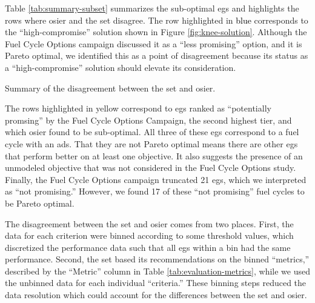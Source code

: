 Table \ref{tab:summary-subset} summarizes the sub-optimal \glspl{eg} and
highlights the rows where \gls{osier} and the \gls{set} disagree. The row
highlighted in \textcolor{black}{blue} corresponds to the ``high-compromise''
solution shown in Figure \ref{fig:knee-solution}. Although the Fuel Cycle
Options campaign discussed it as a ``less promising'' option, and it is Pareto
optimal, we identified this as a point of disagreement because its status as a
``high-compromise'' solution should elevate its consideration.

\begin{table}[ht!]
    \centering
    \caption{Summary of the disagreement between the \gls{set} and \gls{osier}.}
    \label{tab:summary-subset}
    \resizebox{\columnwidth}{!}{}
\end{table}

The rows highlighted in yellow correspond to \glspl{eg} ranked as ``potentially
promsing'' by the Fuel Cycle Options Campaign, the second highest tier, and
which \gls{osier} found to be sub-optimal. All three of these \glspl{eg}
correspond to a fuel cycle with an \gls{ads}. That they are not Pareto optimal
means there are other \glspl{eg} that perform better on at least one objective.
It also suggests the presence of an unmodeled objective that was not considered
in the Fuel Cycle Options study. Finally, the Fuel Cycle Options campaign
truncated 21 \glspl{eg}, which we interpreted as ``not promising.'' However, we
found 17 of these ``not promising'' fuel cycles to be Pareto optimal.

The disagreement between the \gls{set} and \gls{osier} comes from two places.
First, the data for each criterion were binned according to some threshold
values, which discretized the performance data such that all \glspl{eg} within a
bin had the same performance. Second, the \gls{set} based its recommendations on
the binned ``metrics,'' described by the ``Metric'' column in Table
\ref{tab:evaluation-metrics}, while we used the unbinned data for each
individual ``criteria.'' These binning steps reduced the data resolution which
could account for the differences between the \gls{set} and \gls{osier}.

